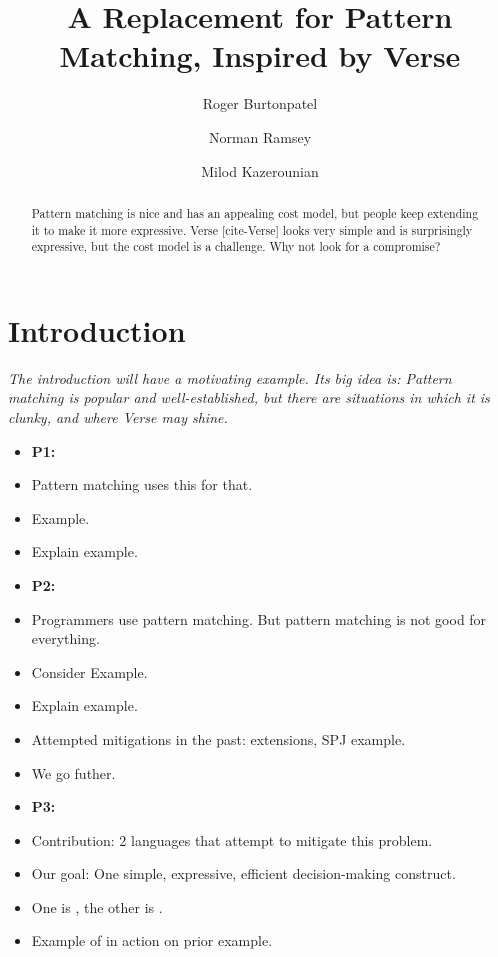 \documentclass[manuscript,screen,review, 12pt]{acmart}
\begin{document}
\title{A Replacement for Pattern Matching, Inspired by Verse}

\author{Roger Burtonpatel}

\author{Norman Ramsey}

\author{Milod Kazerounian}

\renewcommand{\shortauthors}{Burtonpatel et al.}

\begin{abstract}
  Pattern matching is nice and has an appealing cost model, but people keep
  extending it to make it more expressive. Verse [cite-Verse] looks very simple
  and is surprisingly expressive, but the cost model is a challenge. Why not look
  for a compromise?
  \end{abstract}

\maketitle

\section{Introduction}
\bigskip 
\it{The introduction will have a motivating example. Its big idea is: Pattern
matching is popular and well-established, but there are situations in which it
is clunky, and where Verse may shine.}
\bigskip 
\begin{itemize}
    \item \bf{P1}: 
    \item Pattern matching uses this for that. 
    \item Example. 
    \item Explain example. 
    \item \bf{P2}: 
    \item Programmers use pattern matching. But pattern matching is not good for
    everything. 
    \item Consider Example. 
    \item Explain example. 
    \item Attempted mitigations in the past: extensions, SPJ example. 
    \item We go futher. 
    \item \bf{P3}: 
    \item Contribution: 2 languages that attempt to mitigate this problem. 
    \item Our goal: One simple, expressive, efficient decision-making construct.
    \item One is \PPlus, the other is \VMinus. 
    \item Example of \VMinus in action on prior example. 
\end{itemize}
\end{document}
